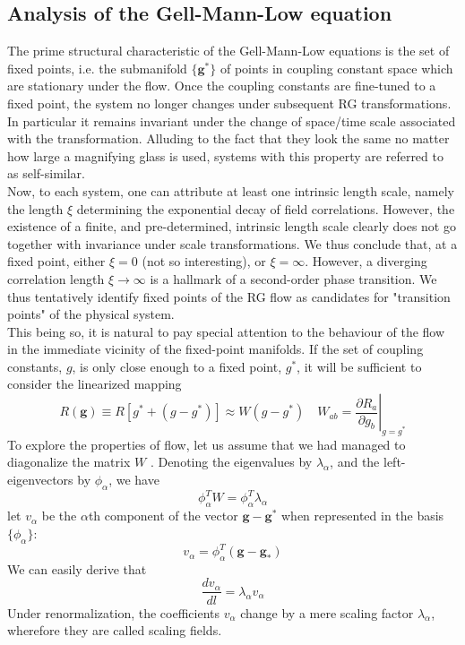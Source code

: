 \documentclass[cyan]{elegantnote}
\begin{document}
\subsection{Analysis of the Gell-Mann-Low equation}
The prime structural characteristic of the Gell-Mann-Low equations is the set of fixed points, i.e. the submanifold $\{\bm{g}^*\}$ of points in coupling constant space which are stationary under the flow. 
Once the coupling constants are fine-tuned to a fixed point, the system no longer changes under subsequent RG transformations. In particular it remains invariant under the change of space/time scale associated with the transformation.
Alluding to the fact that they look the same no matter how large a magnifying glass is used, systems with this property are referred to as self-similar.
\\
Now, to each system, one can attribute at least one intrinsic length scale, namely the length $\xi$ determining the exponential decay of field correlations. 
However, the existence of a finite, and pre-determined, intrinsic length scale clearly does not go together with invariance under scale transformations. We thus conclude that, at a fixed point, either $\xi = 0$ (not so interesting), or $\xi = \infty$. 
However, a diverging correlation length $\xi \to \infty$ is a hallmark of a second-order phase transition. We thus tentatively identify fixed points of the RG flow as candidates for "transition points" of the physical system.
\\
This being so, it is natural to pay special attention to
the behaviour of the flow in the immediate vicinity of the fixed-point manifolds. If the set of coupling constants, $g$, is only close enough to a fixed point, $g^*$, it will be sufficient to consider the linearized mapping
\[R(\bm{g}) \equiv R[g^*+(g-g^*)] \approx W(g-g^*) \quad W_{ab} = \left. \frac{\partial R_a}{\partial g_b} \right|_{g=g^*}\]
To explore the properties of flow, let us assume that we had managed to diagonalize the matrix $W$ . Denoting the eigenvalues by $\lambda_{\alpha}$, and the left-eigenvectors by $\phi_{\alpha}$, we have
\[\phi_{\alpha}^T W = \phi_{\alpha}^T\lambda_{\alpha}\]
let $v_{\alpha}$ be the $\alpha$th component of the vector $\bm{g} - \bm{g}^*$ when represented in the basis $\{\phi_{\alpha}\}$:
\[v_{\alpha} = \phi_{\alpha}^T (\bm{g}-\bm{g}_{*})\]
We can easily derive that
\[\frac{dv_{\alpha}}{dl} = \lambda_{\alpha}v_{\alpha}\]
Under renormalization, the coefficients $v_{\alpha}$ change by a mere scaling factor $\lambda_{\alpha}$, wherefore they are called scaling fields.
\end{document}
